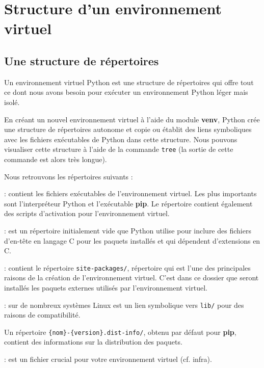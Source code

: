 \section{Structure d'un environnement virtuel}

\subsection*{Une structure de répertoires}

Un environnement virtuel Python est une structure de répertoires qui offre tout ce dont nous avons besoin pour exécuter un environnement Python léger mais isolé.

En créant un nouvel environnement virtuel à l'aide du module \textbf{venv}, Python crée une structure de répertoires autonome et copie ou établit des liens symboliques avec les fichiers exécutables de Python dans cette structure. Nous pouvons visualiser cette structure à l'aide de la commande \texttt{tree} (la sortie de cette commande est alors très longue). 

Nous retrouvons les répertoires suivants :

\begin{description}
    \item[bin/] : contient les fichiers exécutables de l'environnement virtuel. Les plus importants sont l'interpréteur Python et l'exécutable \textbf{pip}. Le répertoire contient également des scripts d'activation pour l'environnement virtuel.
    \item[include/] : est un répertoire initialement vide que Python utilise pour inclure des fichiers d'en-tête en langage C pour les paquets installés et qui dépendent d'extensions en C.
    \item[lib/] : contient le répertoire \texttt{site-packages/}, répertoire qui est l'une des principales raisons de la création de l'environnement virtuel. C'est dans ce dossier que seront installés les paquets externes utilisés par l'environnement virtuel. 
    \item[lib64/] : sur de nombreux systèmes Linux est un lien symbolique vers \texttt{lib/} pour des raisons de compatibilité.
    \item Un répertoire \verb|{nom}-{version}.dist-info/|, obtenu par défaut pour \textbf{pip}, contient des informations sur la distribution des paquets.
    \item[pyvenv.cfg] : est un fichier crucial pour votre environnement virtuel (cf. infra).
\end{description}

